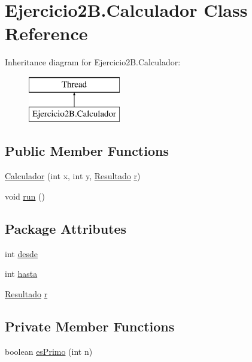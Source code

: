 \hypertarget{class_ejercicio2_b_1_1_calculador}{}\section{Ejercicio2\+B.\+Calculador Class Reference}
\label{class_ejercicio2_b_1_1_calculador}
Inheritance diagram for Ejercicio2\+B.\+Calculador\+:\begin{figure}[H]
\begin{center}
\leavevmode
\includegraphics[height=2.000000cm]{class_ejercicio2_b_1_1_calculador}
\end{center}
\end{figure}
\subsection*{Public Member Functions}
\begin{DoxyCompactItemize}
\item 
\mbox{\hyperlink{class_ejercicio2_b_1_1_calculador_a41f0905d74cf3b5a0d7610a3bbe46f2b}{Calculador}} (int x, int y, \mbox{\hyperlink{class_ejercicio2_b_1_1_resultado}{Resultado}} \mbox{\hyperlink{class_ejercicio2_b_1_1_calculador_ad77e58621891d2594748d725f92e92e5}{r}})
\item 
void \mbox{\hyperlink{class_ejercicio2_b_1_1_calculador_a8a59ae6dadf8749c2a1c3efd5bddf2d3}{run}} ()
\end{DoxyCompactItemize}
\subsection*{Package Attributes}
\begin{DoxyCompactItemize}
\item 
int \mbox{\hyperlink{class_ejercicio2_b_1_1_calculador_a083a56485cec186e46dbcff1adcecd15}{desde}}
\item 
int \mbox{\hyperlink{class_ejercicio2_b_1_1_calculador_a84375442ba851669a0ff1db314543783}{hasta}}
\item 
\mbox{\hyperlink{class_ejercicio2_b_1_1_resultado}{Resultado}} \mbox{\hyperlink{class_ejercicio2_b_1_1_calculador_ad77e58621891d2594748d725f92e92e5}{r}}
\end{DoxyCompactItemize}
\subsection*{Private Member Functions}
\begin{DoxyCompactItemize}
\item 
boolean \mbox{\hyperlink{class_ejercicio2_b_1_1_calculador_a0ec732ad45b3f85cc7511729b618ef76}{es\+Primo}} (int n)
\end{DoxyCompactItemize}



